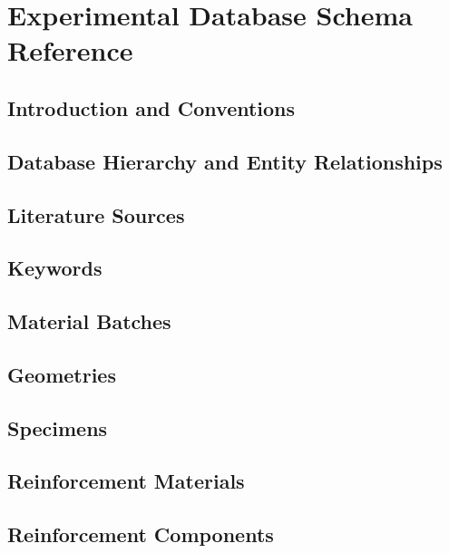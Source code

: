 
\chapter{Experimental Database Schema Reference}
\label{app:experimental-schema}

\section{Introduction and Conventions}

\section{Database Hierarchy and Entity Relationships}

\section{Literature Sources}


\section{Keywords}


\section{Material Batches}


\section{Geometries}


\section{Specimens}


\section{Reinforcement Materials}


\section{Reinforcement Components}


